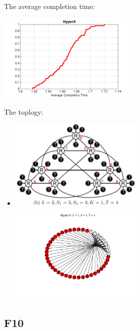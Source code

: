 \documentclass[11pt]{article}
\begin{document}
The average completion time: \\
\centerline{\includegraphics[width=0.5\textwidth]{figure/picture/HyperX.png}}
The toplogy: 
\begin{itemize}
	\item \centerline{}
	\includegraphics[width=0.5\textwidth]{figure/draw/HyperX_original}
	\includegraphics[width=0.5\textwidth]{figure/draw/HyperX.png}
\end{itemize}

\subsection{F10}
\end{document}
